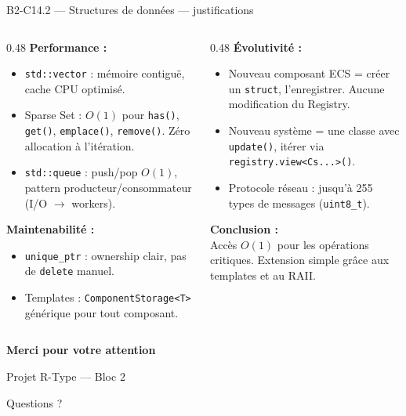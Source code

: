 \documentclass[aspectratio=169,10pt]{beamer}
\begin{document}
\begin{frame}{B2-C14.2 — Structures de données — justifications}
\footnotesize

\begin{columns}[T]
\begin{column}{0.48\textwidth}
\textbf{Performance :}
\begin{itemize}\setlength\itemsep{1pt}
  \item \texttt{std::vector} : mémoire contiguë, cache CPU optimisé.
  \item Sparse Set : $O(1)$ pour \texttt{has()}, \texttt{get()}, \texttt{emplace()}, \texttt{remove()}. Zéro allocation à l'itération.
  \item \texttt{std::queue} : push/pop $O(1)$, pattern producteur/consommateur (I/O $\to$ workers).
\end{itemize}

\textbf{Maintenabilité :}
\begin{itemize}\setlength\itemsep{1pt}
  \item \texttt{unique\_ptr} : ownership clair, pas de \texttt{delete} manuel.
  \item Templates : \texttt{ComponentStorage<T>} générique pour tout composant.
\end{itemize}
\end{column}

\begin{column}{0.48\textwidth}
\textbf{Évolutivité :}
\begin{itemize}\setlength\itemsep{1pt}
  \item Nouveau composant ECS = créer un \texttt{struct}, l'enregistrer. Aucune modification du Registry.
  \item Nouveau système = une classe avec \texttt{update()}, itérer via \texttt{registry.view<Cs...>()}.
  \item Protocole réseau : jusqu'à 255 types de messages (\texttt{uint8\_t}).
\end{itemize}

\vspace{0.2em}
\textbf{Conclusion :}\\
Accès $O(1)$ pour les opérations critiques. Extension simple grâce aux templates et au RAII.
\end{column}
\end{columns}
\end{frame}

\begin{frame}
\centering
\vspace{2cm}
{\Huge\bfseries Merci pour votre attention}

\vspace{1cm}
{\large Projet R-Type — Bloc 2}

\vspace{0.5cm}
{\small Questions ?}
\end{frame}
\end{document}
